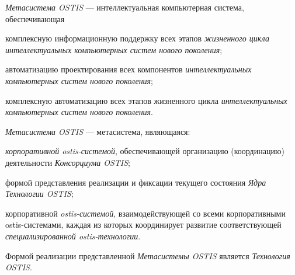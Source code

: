 \textit{Метасистема OSTIS} --- интеллектуальная компьютерная система, обеспечивающая 
\begin{textitemize}
	\item комплексную информационную поддержку всех этапов \textit{жизненного цикла} \textit{интеллектуальных компьютерных систем нового поколения};
	\item автоматизацию проектирования всех компонентов \textit{интеллектуальных компьютерных систем нового поколения};
	\item комплексную автоматизацию всех этапов жизненного цикла \textit{интеллектуальных компьютерных систем нового поколения}.
\end{textitemize}

\textit{Метасистема OSTIS} --- метасистема, являющаяся:
\begin{textitemize}
\item \textit{корпоративной ostis-системой}, обеспечивающей организацию (координацию) деятельности \textit{Консорциума OSTIS};
\item формой представления реализации и фиксации текущего состояния \textit{Ядра Технологии OSTIS};
\item корпоративной \textit{ostis-системой}, взаимодействующей со всеми корпоративными ostis-системами, каждая из которых координирует развитие соответствующей \textit{специализированной ostis-технологии}.
\end{textitemize}

Формой реализации представленной \textit{Метасистемы OSTIS} является \textit{Технология OSTIS}.

